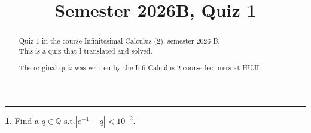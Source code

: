 \documentclass[english]{article}
\theoremstyle{plain}
\theoremstyle{definition}
\newtheorem{problem}[thm]{\protect\problemname}
\theoremstyle{definition}
\providecommand{\problemname}{Problem}
\begin{document}
\title{{\Large\vspace{-6em}Semester 2026B, Quiz 1\vspace{-3em}}}
\maketitle
\begin{abstract}
Quiz 1 in the course Infinitesimal Calculus (2), semester 2026 B.
\\

This is a quiz that I translated and solved.

The original quiz was written by the Infi Calculus 2 course lecturers
at HUJI.
\end{abstract}
\medskip{}

\rule[0.5ex]{1\columnwidth}{1pt}

\medskip{}

\begin{problem}
Find a $q\in\mathbb{Q}\text{ s.t.}\left|e^{-1}-q\right|<10^{-2}$.
\end{problem}
\end{document}
